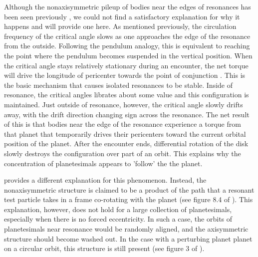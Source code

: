 \documentclass[onecolumn]{aastex63}
\begin{document}
Although the nonaxisymmetric pileup of bodies near the edges of resonances has been seen previously \citep{2000Icar..143...45R, 2016ApJ...818..159T}, we could not find a satisfactory explanation for why it happens and will provide one here. As mentioned previously, the circulation frequency of the critical angle slows as one approaches the edge of the resonance from the outside. Following the pendulum analogy, this is equivalent to reaching the point where the pendulum becomes suspended in the vertical position. When the critical angle stays relatively stationary during an encounter, the net torque will drive the longitude of pericenter towards the point of conjunction \citep{1976ARA&A..14..215P}.  This is the basic mechanism that causes isolated resonances to be stable. Inside of resonance, the critical angles librates about some value and this configuration is maintained. Just outside of resonance, however, the critical angle slowly drifts away, with the drift direction changing sign across the resonance. The net result of this is that bodies near the edge of the resonance experience a torque from that planet that temporarily drives their pericenters toward the current orbital position of the planet. After the encounter ends, differential rotation of the disk slowly destroys the configuration over part of an orbit. This explains why the concentration of planetesimals appears to 'follow' the the planet.

\citet{2016ApJ...818..159T} provides a different explanation for this phenomenon. Instead, the nonaxisymmetric structure is claimed to be a product of the path that a resonant test particle takes in a frame co-rotating with the planet (see figure 8.4 of \citet{2000ssd..book.....M}). This explanation, however, does not hold for a large collection of planetesimals, especially when there is no forced eccentricity. In such a case, the orbits of planetesimals near resonance would be randomly aligned, and the axisymmetric structure should become washed out. In the case with a perturbing planet planet on a circular orbit, this structure is still present (see figure 3 of \citet{2016ApJ...818..159T}).
\end{document}
